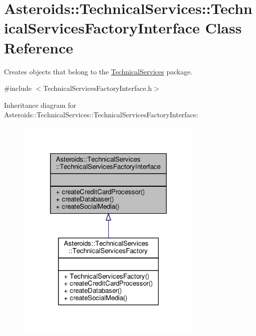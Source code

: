 \hypertarget{classAsteroids_1_1TechnicalServices_1_1TechnicalServicesFactoryInterface}{}\section{Asteroids\+:\+:Technical\+Services\+:\+:Technical\+Services\+Factory\+Interface Class Reference}
\label{classAsteroids_1_1TechnicalServices_1_1TechnicalServicesFactoryInterface}


Creates objects that belong to the \hyperlink{namespaceAsteroids_1_1TechnicalServices}{Technical\+Services} package.  




{\ttfamily \#include $<$Technical\+Services\+Factory\+Interface.\+h$>$}



Inheritance diagram for Asteroids\+:\+:Technical\+Services\+:\+:Technical\+Services\+Factory\+Interface\+:\nopagebreak
\begin{figure}[H]
\begin{center}
\leavevmode
\includegraphics[width=254pt]{classAsteroids_1_1TechnicalServices_1_1TechnicalServicesFactoryInterface__inherit__graph}
\end{center}
\end{figure}


